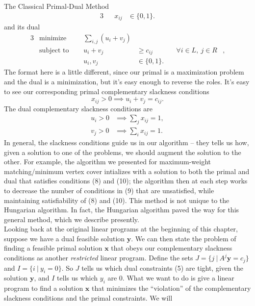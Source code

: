 \documentclass[11pt]{article}
\renewcommand{\'}{^{'}}
\begin{document}
\begin{section}{The Classical Primal-Dual Method}
\begin{alignat}{3}
				&& x_{ij} & \in \{0,1\}.
	\end{alignat}
	and its dual
	\begin{alignat}{3}
		& \text{minimize } & \sum_{i,j} (u_i + v_j)& \\
		& \text{subject to } \quad & u_i + v_j & \geq c_{ij} & \quad \forall 
					i\in L,\ j\in R &, \\
				    && u_i,v_j & \in \{0,1\}.
	\end{alignat}
	The format here is a little different, since our primal is a maximization problem and the dual 
	is a minimization, but it's easy enough to reverse the roles. It's easy to see our 
	corresponding primal complementary slackness conditions
	\begin{equation}
		x_{ij} > 0 \implies u_i + v_j = c_{ij}.
	\end{equation}
	The dual complementary slackness conditions are
	\begin{align}
		u_i > 0 &\implies \sum_j x_{ij} = 1,\\
		v_j > 0 &\implies \sum_i x_{ij} = 1.
	\end{align}
	In general, the slackness conditions guide us in our algorithm -- they tells us how, given a 
	solution to one of the problems, we should augment the solution to the other. For example, the 
	algorithm we presented for maximum-weight matching/minimum vertex cover intializes with 
	a solution to both the primal and dual that satisfies conditions (8) and (10); the algorithm 
	then at each step works to decrease the number of conditions in (9) that are unsatisfied, while 
	maintaining satisfiability of (8) and (10). This method is not unique to the Hungarian 
	algorithm. In fact, the Hungarian algorithm paved the way for this general method, which we 
	describe presently.\\
	Looking back at the original linear programs at the beginning of this chapter, suppose we have 
	a dual feasible solution $\mathbf{y}$. We can then state the problem of finding a feasible 
	primal 
	solution $\mathbf{x}$ that obeys our complementary slackness conditions as another 
	\emph{restricted} 
	linear program. Define the sets $J = \{j\ |\ A^{j}\mathbf{y} = c_j\}$ and 
	$I = \{i\ |\ y_i = 0\}$. So $J$ tells us which dual constraints (5) are tight, 
	given the solution $\mathbf{y}$, and $I$ tells us which $y_i$ are 0. What we want to do is 
	give a linear program to find a solution $\mathbf{x}$ that minimizes the 
	``violation'' of the complementary slackness conditions and the primal constraints. We will 

\end{section}
\end{document}
